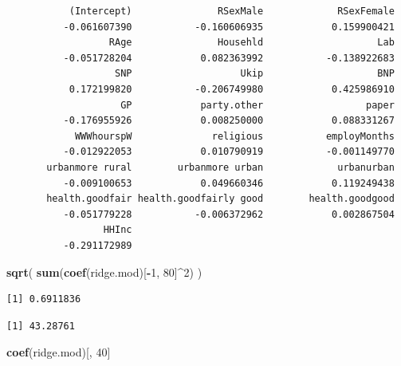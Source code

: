 \documentclass[]{article}
\newenvironment{Shaded}{\begin{snugshade}}{\end{snugshade}}
\newcommand{\DecValTok}[1]{\textcolor[rgb]{0.00,0.00,0.81}{#1}}
\newcommand{\KeywordTok}[1]{\textcolor[rgb]{0.13,0.29,0.53}{\textbf{#1}}}
\newcommand{\NormalTok}[1]{#1}
\newcommand{\OperatorTok}[1]{\textcolor[rgb]{0.81,0.36,0.00}{\textbf{#1}}}
\begin{document}
\begin{verbatim}
           (Intercept)               RSexMale             RSexFemale 
          -0.061607390           -0.160606935            0.159900421 
                  RAge               Househld                    Lab 
          -0.051728204            0.082363992           -0.138922683 
                   SNP                   Ukip                    BNP 
           0.172199820           -0.206749980            0.425986910 
                    GP            party.other                  paper 
          -0.176955926            0.008250000            0.088331267 
            WWWhourspW              religious           employMonths 
          -0.012922053            0.010790919           -0.001149770 
       urbanmore rural        urbanmore urban             urbanurban 
          -0.009100653            0.049660346            0.119249438 
       health.goodfair health.goodfairly good        health.goodgood 
          -0.051779228           -0.006372962            0.002867504 
                 HHInc 
          -0.291172989 
\end{verbatim}

\begin{Shaded}
\begin{Highlighting}[]
\KeywordTok{sqrt}\NormalTok{( }\KeywordTok{sum}\NormalTok{(}\KeywordTok{coef}\NormalTok{(ridge.mod)[}\OperatorTok{-}\DecValTok{1}\NormalTok{, }\DecValTok{80}\NormalTok{]}\OperatorTok{^}\DecValTok{2}\NormalTok{) )}
\end{Highlighting}
\end{Shaded}

\begin{verbatim}
[1] 0.6911836
\end{verbatim}

\begin{Shaded}
\end{Shaded}

\begin{verbatim}
[1] 43.28761
\end{verbatim}

\begin{Shaded}
\begin{Highlighting}[]
\KeywordTok{coef}\NormalTok{(ridge.mod)[, }\DecValTok{40}\NormalTok{]}
\end{Highlighting}
\end{Shaded}
\end{document}
